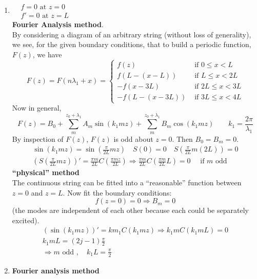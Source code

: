 \documentclass[twoside,10pt]{amsart}
\newcommand{\problemhead}[1]
  {\smallskip
   \noindent{\large\bf Problem #1.}
   \smallskip}
\begin{document}
\problemhead{2.29}
\begin{enumerate}
  \item $ \begin{aligned}
    & f=0 \text{ at } z = 0 \\
    & f' = 0 \text{ at } z = L 
  \end{aligned}$  \\
    \textbf{ Fourier Analysis method}.  \\
    By considering a diagram of an arbitrary string (without loss of generality), we see, for the given boundary conditions, that to build a periodic function, $F(z)$, we have
\[
F(z) = F(n \lambda_1 + x) = \begin{cases} f(z) & \text{ if } 0 \leq x < L \\
  f(L-(x-L)) & \text{ if } L \leq x < 2 L \\
  -f(x-3L) & \text{ if } 2L \leq x < 3L \\
  -f(L - (x-3L) ) & \text{ if } 3L \leq x < 4 L 
\end{cases}
\]
Now in general, 
\[
F(z) = B_0 + \sum_m^{ z_0 + \lambda_1 } A_m \sin{ (k_1 m z) } + \sum_m^{z_0 + \lambda_1} B_m \cos{ (k_1 m z) } \quad \quad k_1 = \frac{2\pi }{\lambda_1} 
\]
By inspection of $F(z)$, $F(z)$ is odd about $z=0$.  Then $B_0 = B_m = 0$.  
\[
\begin{gathered}
  \sin{ (k_1 m z) } = \sin{ \left( \frac{\pi}{2L} mz \right) } \quad S(0) =  0 \quad S\left( \frac{\pi}{2L} m (2L) \right) = 0 \\
  \left( S\left( \frac{\pi}{2L} m z\right) \right)' = \frac{ \pi m}{ 2L} C\left( \frac{ \pi m z}{ 2L } \right) \Longrightarrow \frac{\pi m }{2L} C\left( \frac{ \pi m }{2L } L \right) = 0 \quad \text{ if $m$ odd } 
\end{gathered}
\]
\textbf{ ``physical'' method } \\
The continuous string can be fitted into a ``reasonable'' function between $z=0$ and $z=L$.  Now fit the boundary conditions:
\[
f(z=0) = 0 \Longrightarrow B_m =0
\]
(the modes are independent of each other because each could be separately excited).  
\[
\begin{gathered}
  (\sin{(k_1 m z)})' = km_1 C(k_1 m z) \Longrightarrow k_1 m C(k_1 m L) = 0 \\
  k_1 m L =  (2j-1) \frac{\pi}{2} \\
  \Longrightarrow \boxed{ m \text{ odd }, \quad k_1 L = \frac{\pi}{2} }
\end{gathered}
\]
  \item \textbf{ Fourier analysis method } \\

\end{enumerate}
\end{document}
